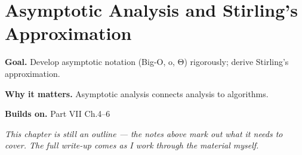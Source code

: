 \chapter{Asymptotic Analysis and Stirling's Approximation}
\label{ch:07-real-analysis-and-measure-theory-07}

\begin{chapterintro}
\textbf{Goal.} Develop asymptotic notation (Big-O, o, Θ) rigorously; derive Stirling's approximation.

\textbf{Why it matters.} Asymptotic analysis connects analysis to algorithms.

\textbf{Builds on.} Part VII Ch.4–6
\end{chapterintro}

\textit{This chapter is still an outline --- the notes above mark out what it needs to cover. The full write-up comes as I work through the material myself.}
